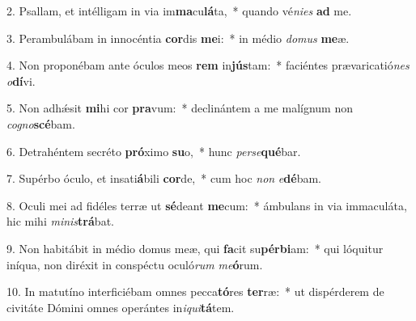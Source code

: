 2. Psallam, et intélligam in via im\textbf{ma}cu\textbf{lá}ta,~*  quando vé\textit{ni}\textit{es} \textbf{ad} me.\

3. Perambulábam in innocéntia \textbf{cor}dis \textbf{me}i:~*  in médio \textit{do}\textit{mus} \textbf{me}æ.\

4. Non proponébam ante óculos meos \textbf{rem} in\textbf{jús}tam:~*  faciéntes prævaricatió\textit{nes} \textit{o}\textbf{dí}vi.\

5. Non adhǽsit \textbf{mi}hi cor \textbf{pra}vum:~*  declinántem a me malígnum non \textit{co}\textit{gno}\textbf{scé}bam.\

6. Detrahéntem secréto \textbf{pró}ximo \textbf{su}o,~*  hunc \textit{per}\textit{se}\textbf{qué}bar.\

7. Supérbo óculo, et insati\textbf{á}bili \textbf{cor}de,~*  cum hoc \textit{non} \textit{e}\textbf{dé}bam.\

8. Oculi mei ad fidéles terræ ut \textbf{sé}deant \textbf{me}cum:~*  ámbulans in via immaculáta, hic mihi \textit{mi}\textit{nis}\textbf{trá}bat.\

9. Non habitábit in médio domus meæ, qui \textbf{fa}cit su\textbf{pér}\textbf{bi}am:~*  qui lóquitur iníqua, non diréxit in conspéctu oculó\textit{rum} \textit{me}\textbf{ó}rum.\

10. In matutíno interficiébam omnes pecca\textbf{tó}res \textbf{ter}ræ:~*  ut dispérderem de civitáte Dómini omnes operántes in\textit{i}\textit{qui}\textbf{tá}tem.\

